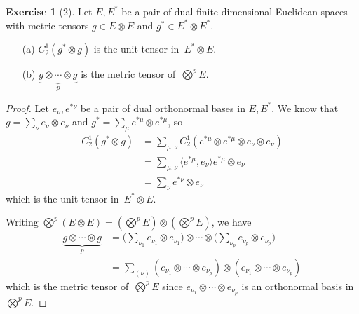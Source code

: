 \documentclass[letterpaper,12pt]{article}
\newcommand{\tprod}{\otimes}
\newcommand{\bigtprod}{\bigotimes}
\newcommand{\medtprod}{{\textstyle\bigtprod}}
\newcommand{\sprod}[2]{\langle#1,#2\rangle}
\theoremstyle{definition}
\newtheorem*{exer}{Exercise}
\theoremstyle{remark}
\begin{document}
\begin{exer}[2]
Let \(E,E^*\) be a pair of dual finite-dimensional Euclidean spaces with metric tensors \(g\in E\tprod E\) and \(g^*\in E^*\tprod E^*\).
\begin{enumerate}
\item[(a)] \(C^1_2(g^*\tprod g)\) is the unit tensor in~\(E^*\tprod E\).
\item[(b)] \(\underbrace{g\tprod\cdots\tprod g}_p\) is the metric tensor of~\(\medtprod^p E\).
\end{enumerate}
\end{exer}
\begin{proof}
Let \(e_{\nu},e^{*\nu}\) be a pair of dual orthonormal bases in \(E,E^*\). We know that \(g=\sum_{\nu}e_{\nu}\tprod e_{\nu}\) and \(g^*=\sum_{\mu}e^{*\mu}\tprod e^{*\mu}\), so
\begin{align*}
C^1_2(g^*\tprod g)&=\sum_{\mu,\nu}C^1_2(e^{*\mu}\tprod e^{*\mu}\tprod e_{\nu}\tprod e_{\nu})\\
	&=\sum_{\mu,\nu}\sprod{e^{*\mu}}{e_{\nu}}e^{*\mu}\tprod e_{\nu}\\
	&=\sum_{\nu}e^{*\nu}\tprod e_{\nu}
\end{align*}
which is the unit tensor in~\(E^*\tprod E\).

Writing \(\medtprod^p(E\tprod E)=(\medtprod^p E)\tprod(\medtprod^p E)\), we have
\begin{align*}
\underbrace{g\tprod\cdots\tprod g}_p&=\bigl(\sum_{\nu_1}e_{\nu_1}\tprod e_{\nu_1}\bigr)\tprod\cdots\tprod\bigl(\sum_{\nu_p}e_{\nu_p}\tprod e_{\nu_p}\bigr)\\
	&=\sum_{(\nu)}(e_{\nu_1}\tprod\cdots\tprod e_{\nu_p})\tprod(e_{\nu_1}\tprod\cdots\tprod e_{\nu_p})
\end{align*}
which is the metric tensor of~\(\medtprod^p E\) since \(e_{\nu_1}\tprod\cdots\tprod e_{\nu_p}\) is an orthonormal basis in~\(\medtprod^p E\).
\end{proof}
\end{document}
